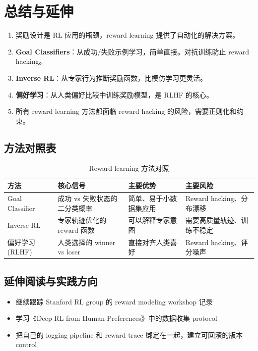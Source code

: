 \section{总结与延伸}

\begin{enumerate}
    \item 奖励设计是 RL 应用的瓶颈，reward learning 提供了自动化的解决方案。
    \item \textbf{Goal Classifiers}：从成功/失败示例学习，简单直接。对抗训练防止 reward hacking。
    \item \textbf{Inverse RL}：从专家行为推断奖励函数，比模仿学习更灵活。
    \item \textbf{偏好学习}：从人类偏好比较中训练奖励模型，是 RLHF 的核心。
    \item 所有 reward learning 方法都面临 reward hacking 的风险，需要正则化和约束。
\end{enumerate}

\subsection{方法对照表}

\begin{table}[H]
\centering
\begin{tabular}{p{} p{} p{} p{}}
\toprule
方法 & 核心信号 & 主要优势 & 主要风险 \\
\midrule
Goal Classifier & 成功 vs 失败状态的二分类概率 & 简单、易于小数据集应用 & Reward hacking、分布漂移 \\
Inverse RL & 专家轨迹优化的 reward 函数 & 可以解释专家意图 & 需要高质量轨迹、训练不稳定 \\
偏好学习 (RLHF) & 人类选择的 winner vs loser & 直接对齐人类喜好 & Reward hacking、评分噪声 \\
\bottomrule
\end{tabular}
\caption{Reward learning 方法对照}
\end{table}

\subsection{延伸阅读与实践方向}

\begin{itemize}
    \item 继续跟踪 Stanford RL group 的 reward modeling workshop 记录
    \item 学习《Deep RL from Human Preferences》中的数据收集 protocol
    \item 把自己的 logging pipeline 和 reward trace 绑定在一起，建立可回滚的版本 control
\end{itemize}

